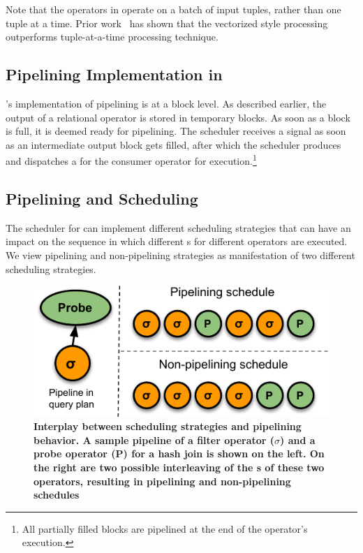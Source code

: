 Note that the operators in \sys{} operate on a batch of input tuples, rather than one tuple at a time. 
Prior work~\cite{hyper-pipelining} has shown that the vectorized style processing outperforms tuple-at-a-time processing technique.

\subsection{Pipelining Implementation in \sys{}}
\sys{}'s implementation of pipelining is at a block level.
As described earlier, the output of a relational operator \wo{} is stored in temporary blocks.
As soon as a block is full, it is deemed ready for pipelining.
The scheduler receives a signal as soon as an intermediate output block gets filled, after which the scheduler produces and dispatches a \wo{} for the consumer operator for execution.\footnote{All partially filled blocks are pipelined at the end of the operator's execution.}


\subsection{Pipelining and Scheduling}\label{ssec:system-scheduling}
The scheduler for \sys{} can implement different scheduling strategies that can have an impact on the sequence in which different \wo{}s for different operators are executed.
We view pipelining and non-pipelining strategies as manifestation of two different scheduling strategies. 

\begin{figure}[t]
	\centering 
	\includegraphics{pipeline/figures/Pipe-Nopipe-schedules}
	\caption{\textbf{Interplay between scheduling strategies and pipelining behavior. A sample pipeline of a filter operator ($\sigma$) and a probe operator (P) for a hash join is shown on the left. On the right are two possible interleaving of the \wo{}s of these two operators, resulting in pipelining and non-pipelining schedules}}
	\label{fig:pipelining-schedules}
\end{figure}

